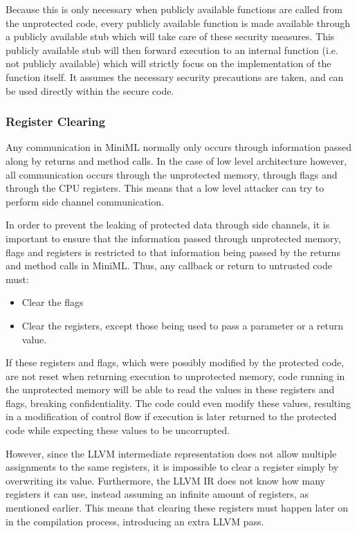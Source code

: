Because this is only necessary when publicly available functions are called from the unprotected code, every publicly available function is made available through a publicly available stub which will take care of these security measures.
This publicly available stub will then forward execution to an internal function (i.e. not publicly available) which will strictly focus on the implementation of the function itself.
It assumes the necessary security precautions are taken, and can be used directly within the secure code.

\subsubsection{Register Clearing}
Any communication in \mbox{MiniML} normally only occurs through information passed along by returns and method calls.
In the case of low level architecture however, all communication occurs through the unprotected memory, through flags and through the CPU registers.
This means that a low level attacker can try to perform side channel communication.

In order to prevent the leaking of protected data through side channels, it is important to ensure that the information passed through unprotected memory, flags and registers is restricted to that information being passed by the returns and method calls in \mbox{MiniML}.
Thus, any callback or return to untrusted code must\cite{Agten:2012:SCM:2354412.2355247}:
\begin{itemize}
\item Clear the flags
\item Clear the registers, except those being used to pass a parameter or a return value.
\end{itemize}

If these registers and flags, which were possibly modified by the protected code, are not reset when returning execution to unprotected memory, code running in the unprotected memory will be able to read the values in these registers and flags, breaking confidentiality. The code could even modify these values, resulting in a modification of control flow if execution is later returned to the protected code while expecting these values to be uncorrupted.

However, since the LLVM intermediate representation does not allow multiple assignments to the same registers, it is impossible to clear a register simply by overwriting its value.
Furthermore, the LLVM IR does not know how many registers it can use, instead assuming an infinite amount of registers, as mentioned earlier. This means that clearing these registers must happen later on in the compilation process, introducing an extra LLVM pass.

